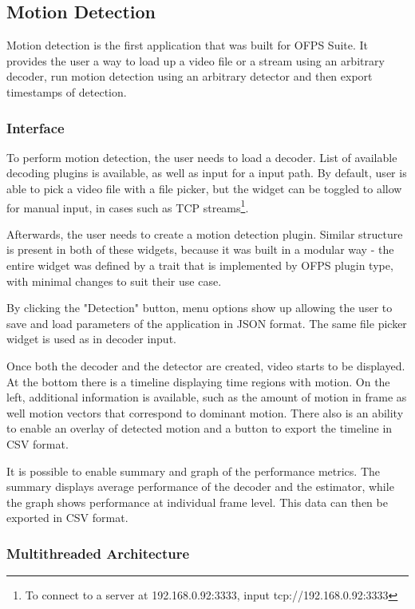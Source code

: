\documentclass[11pt,english]{report}
\begin{document}
\subsection{Motion Detection}

Motion detection is the first application that was built for OFPS Suite. It provides the user a way to load up a video file or a stream using an arbitrary decoder, run motion detection using an arbitrary detector and then export timestamps of detection.

\subsubsection{Interface}

To perform motion detection, the user needs to load a decoder. List of available decoding plugins is available, as well as input for a input path. By default, user is able to pick a video file with a file picker, but the widget can be toggled to allow for manual input, in cases such as TCP streams\footnote{To connect to a server at 192.168.0.92:3333, input tcp://192.168.0.92:3333}.

Afterwards, the user needs to create a motion detection plugin. Similar structure is present in both of these widgets, because it was built in a modular way - the entire widget was defined by a trait that is implemented by OFPS plugin type, with minimal changes to suit their use case. 

By clicking the "Detection" button, menu options show up allowing the user to save and load parameters of the application in JSON format. The same file picker widget is used as in decoder input.

Once both the decoder and the detector are created, video starts to be displayed. At the bottom there is a timeline displaying time regions with motion. On the left, additional information is available, such as the amount of motion in frame as well motion vectors that correspond to dominant motion. There also is an ability to enable an overlay of detected motion and a button to export the timeline in CSV format.

It is possible to enable summary and graph of the performance metrics. The summary displays average performance of the decoder and the estimator, while the graph shows performance at individual frame level. This data can then be exported in CSV format.

\subsubsection{Multithreaded Architecture}
\end{document}
